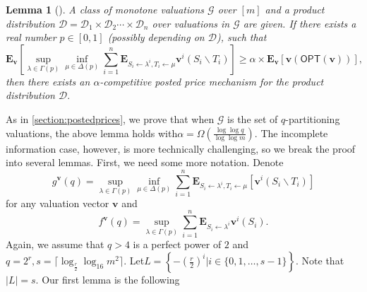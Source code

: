 \documentclass[11pt]{article}%
\newtheorem{lemma}[theorem]{Lemma}
\numberwithin{theorem}{subsection}
\newcommand{\boldv}{\mathbf{v}}
\newcommand{\opt}{\mathsf{OPT}}
\newcommand{\expect}{\mathbf{E}}
\begin{document}
\begin{lemma}[{\cite[p.268]{DuttingKL20}}]
\label{lem:minimaxgamebayes}
A class of monotone valuations $\mathcal{G}$ over $[m]$ and a product distribution 
$\mathcal{D} = \mathcal{D}_1\times \mathcal{D}_2\cdots\times\mathcal{D}_n$ over valuations in $\mathcal{G}$ are given.
If there exists a real number $p \in [0,1]$ (possibly depending on $\mathcal{D}$), such that 
$$
\expect_{\boldv}\left[
\sup_{\lambda \in \Gamma(p)}
\inf_{\mu \in \Delta(p)}
\sum_{i = 1}^n 
\expect_{S_i\longleftarrow \lambda^i, T_i \longleftarrow \mu}\boldv^i(S_i\backslash T_i)
\right]\ge 
\alpha\times \expect_\boldv[\boldv(\opt(\boldv))],
$$
then there exists an $\alpha$-competitive posted price mechanism for the product distribution $\mathcal{D}.$
\end{lemma}

\noindent
As in \cref{section:postedprices}, we prove that when $\mathcal{G}$ is the set of $q$-partitioning valuations, the above lemma holds with\linebreak $\alpha = \Omega\left(\frac{\log \log q}{\log \log m}\right).$ The incomplete information case, however, is more technically challenging, so we break the proof into several lemmas. First, we need some more notation. Denote
$$
g^\boldv(q) = 
\sup_{\lambda \in \Gamma(p)}
\inf_{\mu \in \Delta(p)}
\sum_{i = 1}^n 
\expect_{S_i\longleftarrow \lambda^i, T_i \longleftarrow \mu}[\boldv^i(S_i\backslash T_i)]
$$
for any valuation vector $\boldv$ and
$$
f^\boldv(q) = 
\sup_{\lambda \in \Gamma(p)}
\sum_{i = 1}^n 
\expect_{S_i\longleftarrow \lambda^i}\boldv^i(S_i).
$$
Again, we assume that $q>4$ is a perfect power of $2$ and $q = 2^r,s = \lceil\log_{\frac{r}{2}}\log_{16} m^2\rceil.$
Let\linebreak $\displaystyle L = \left\{ {- \left(\frac{r}{2}\right)^i}|
i \in \{0,1,\ldots, s-1\}\right\}
.$ Note that $|L| = s .$ Our first lemma is the following 
\end{document}

